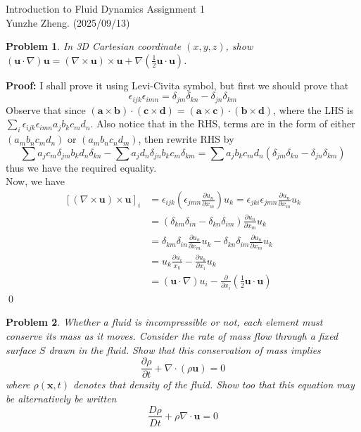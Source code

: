 \documentclass[12pt]{article}
\newtheorem{problem}{Problem}
\begin{document}
\noindent Introduction to Fluid Dynamics \hfill Assignment 1\\
Yunzhe Zheng. (2025/09/13)

\hrulefill

\begin{problem}
    In 3D Cartesian coordinate $(x,y,z)$, show $(\textbf{u}\cdot\nabla)\textbf{u}=(\nabla\times\textbf{u})\times\textbf{u}+\nabla(\frac{1}{2}\textbf{u}\cdot\textbf{u})$.
\end{problem}

\textbf{Proof:} I shall prove it using Levi-Civita symbol, but first we should prove that 
$$
\epsilon_{ijk}\epsilon_{imn}=\delta_{jm}\delta_{kn}-\delta_{jn}\delta_{km}
$$
Observe that since $(\textbf{a}\times\textbf{b})\cdot(\textbf{c}\times\textbf{d})=(\textbf{a}\times\textbf{c})\cdot(\textbf{b}\times\textbf{d})$, where the LHS is $\sum\limits_{i}\epsilon_{ijk}\epsilon_{imn}a_jb_kc_md_n$. Also notice that in the RHS, terms are in the form of either $(a_mb_nc_md_n)$ or $(a_mb_nc_nd_m)$, then rewrite RHS by 
$$
    \sum\limits a_jc_m\delta_{jm}b_kd_n\delta_{kn}-\sum\limits a_jd_n\delta_{jn}b_kc_m\delta_{km} = \sum\limits a_jb_kc_md_n(\delta_{jm}\delta_{kn}-\delta_{jn}\delta_{km})
$$ thus we have the required equality. \\
\indent Now, we have 
\begin{align*}
    \left[(\nabla\times \textbf{u})\times \textbf{u}\right]_i&=\epsilon_{ijk}\left(\epsilon_{jmn}\frac{\partial u_n}{\partial x_m}\right)u_k =\epsilon_{jki}\epsilon_{jmn}\frac{\partial u_n}{\partial x_m}u_k \\
    &= (\delta_{km}\delta_{in}-\delta_{kn}\delta_{im})\frac{\partial u_n}{\partial x_m}u_k \\
    &=\delta_{km}\delta_{in}\frac{\partial u_n}{\partial x_m}u_k-\delta_{kn}\delta_{im}\frac{\partial u_n}{\partial x_m}u_k \\
    &= u_k\frac{\partial u_i}{x_k}-\frac{\partial u_k}{\partial x_i}u_k \\
    &= (\textbf{u}\cdot \nabla)u_i - \frac{\partial}{\partial x_i}\left(\frac{1}{2}\textbf{u}\cdot\textbf{u}\right)
\end{align*}
\qed
\\
\begin{problem}
    Whether a fluid is incompressible or not, each element must conserve its mass as it moves. Consider the rate of mass flow through a fixed surface $S$ drawn in the fluid. Show that this conservation of mass implies 
    $$
        \frac{\partial \rho}{\partial t} + \nabla\cdot(\rho\textbf{u})=0
    $$ where $\rho(\textbf{x}, t)$ denotes that density of the fluid. Show too that this equation may be alternatively be written 
    $$
        \frac{D\rho}{Dt}+\rho\nabla\cdot\textbf{u}=0
    $$
\end{problem}
\end{document}
